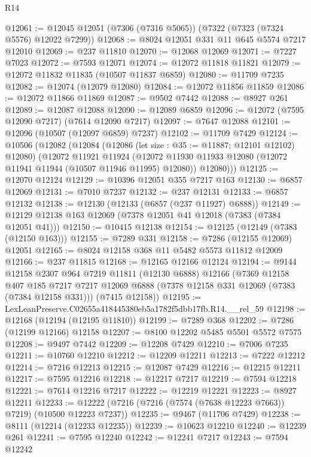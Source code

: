 \begin{lexlean}{R14}
\begin{coremodule}
@12061 := @12045 @12051 (@7306 (@7316 @5065)) (@7322 (@7323 (@7324 @5576) @12022 @7299))
@12068 := @8024 @12051 @331 @11 @645 @5574 @7217 @12010
@12069 := @237 @11810
@12070 := @12068 @12069
@12071 := @7227 @7023
@12072 := @7593 @12071
@12074 := @12072 @11818 @11821
@12079 := @12072 @11832 @11835 (@10507 @11837 @6859)
@12080 := @11709 @7235
@12082 := @12074 (@12079 @12080)
@12084 := @12072 @11856 @11859
@12086 := @12072 @11866 @11869
@12087 := @9502 @7442
@12088 := @8927 @261
@12089 := @12087 @12088
@12090 := @12089 @6859
@12096 := @12072 (@7595 @12090 @7217) (@7614 @12090 @7217)
@12097 := @7647 @12088
@12101 := @12096 (@10507 (@12097 @6859) @7237)
@12102 := @11709 @7429
@12124 := @10506
    (@12082
      (@12084
        (@12086 (let size : @35 := @11887; @12101 @12102) @12080)
        (@12072
          @11921
          @11924
          (@12072 @11930 @11933 @12080 (@12072 @11941 @11944 (@10507 @11946 @11995) @12080))
          @12080)))
@12125 := @12070 @12124
@12129 := @10396 @12051 @355 @7217 @163
@12130 := @6857 @12069
@12131 := @7010 @7237
@12132 := @237 @12131
@12133 := @6857 @12132
@12138 := @12130 (@12133 (@6857 (@237 @11927) @6888))
@12149 := @12129 @12138 @163 @12069 (@7378 @12051 @41 @12018 (@7383 (@7384 @12051 @41)))
@12150 := @10415 @12138
@12154 := @12125 (@12149 (@7383 (@12150 @163)))
@12155 := @7289 @331
@12158 := @7286 (@12155 @12069) @12051
@12165 := @8024 @12158 @368 @11 @5482 @5573 @11812 @12009
@12166 := @237 @11815
@12168 := @12165 @12166 @12124
@12194 := @9144
    @12158
    @2307
    @964
    @7219
    @11811
    (@12130 @6888)
    @12166
    (@7369
      @12158
      @407
      @185
      @7217
      @7217
      @12069
      @6888
      (@7378 @12158 @331 @12069 (@7383 (@7384 @12158 @331)))
      (@7415 @12158))
@12195 := LexLeanPreserve.C02655a418445380eb5a1782f5dbb17fb.R14.__rel_59
@12198 := @12168 (@12194 (@12195 @11810))
@12199 := @7289 @368
@12202 := @7286 (@12199 @12166) @12158
@12207 := @8100 @12202 @5485 @5501 @5572 @7575
@12208 := @9497 @7442
@12209 := @12208 @7429
@12210 := @7006 @7235
@12211 := @10760 @12210
@12212 := @12209 @12211
@12213 := @7222 @12212
@12214 := @7216 @12213
@12215 := @12087 @7429
@12216 := @12215 @12211
@12217 := @7595 @12216
@12218 := @12217 @7217
@12219 := @7594 @12218
@12221 := @7614 @12216 @7217
@12222 := @12219 @12221
@12223 := @8927 @12211
@12233 := @12222 (@7216 (@7216 (@7574 (@7638 @12223 @7663)) @7219) (@10500 @12223 @7237))
@12235 := @9467 (@11706 @7429)
@12238 := @8111 (@12214 (@12233 @12235))
@12239 := @10623 @12210
@12240 := @12239 @261
@12241 := @7595 @12240
@12242 := @12241 @7217
@12243 := @7594 @12242

\end{coremodule}
\end{lexlean}
